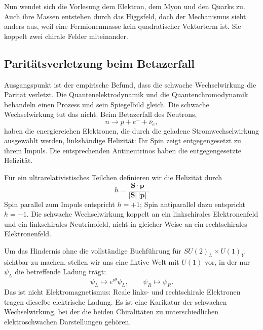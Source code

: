 Nun wendet sich die Vorlesung dem Elektron, dem Myon und den Quarks zu. Auch ihre Massen entstehen durch das Higgsfeld, doch der Mechanismus sieht anders aus, weil eine Fermionenmasse kein quadratischer Vektorterm ist. Sie koppelt zwei chirale Felder miteinander.

\subsection{Paritätsverletzung beim Betazerfall}

Ausgangspunkt ist der empirische Befund, dass die schwache Wechselwirkung die Parität verletzt. Die Quantenelektrodynamik und die Quantenchromodynamik behandeln einen Prozess und sein Spiegelbild gleich. Die schwache Wechselwirkung tut das nicht. Beim Betazerfall des Neutrons,
\begin{equation}
  n\longrightarrow p+e^-+\bar\nu_e,
  \label{eq:l09-beta-decay}
\end{equation}
haben die energiereichen Elektronen, die durch die geladene Stromwechselwirkung ausgewählt werden, linkshändige Helizität: Ihr Spin zeigt entgegengesetzt zu ihrem Impuls. Die entsprechenden Antineutrinos haben die entgegengesetzte Helizität.

Für ein ultrarelativistisches Teilchen definieren wir die Helizität durch
\begin{equation}
  h=\frac{\bm S\cdot\bm p}{|\bm S|\,|\bm p|}.
\end{equation}
Spin parallel zum Impuls entspricht \(h=+1\); Spin antiparallel dazu entspricht \(h=-1\). Die schwache Wechselwirkung koppelt an ein linkschirales Elektronenfeld und ein linkschirales Neutrinofeld, nicht in gleicher Weise an ein rechtschirales Elektronenfeld.

Um das Hindernis ohne die vollständige Buchführung für \(SU(2)_L\times U(1)_Y\) sichtbar zu machen, stellen wir uns eine fiktive Welt mit \(U(1)\) vor, in der nur \(\psi_L\) die betreffende Ladung trägt:
\begin{equation}
  \psi_L\longmapsto e^{i\theta}\psi_L,
  \qquad
  \psi_R\longmapsto\psi_R .
  \label{eq:l09-chiral-toy-charge}
\end{equation}
Das ist nicht Elektromagnetismus: Reale links- und rechtschirale Elektronen tragen dieselbe elektrische Ladung. Es ist eine Karikatur der schwachen Wechselwirkung, bei der die beiden Chiralitäten zu unterschiedlichen elektroschwachen Darstellungen gehören.

